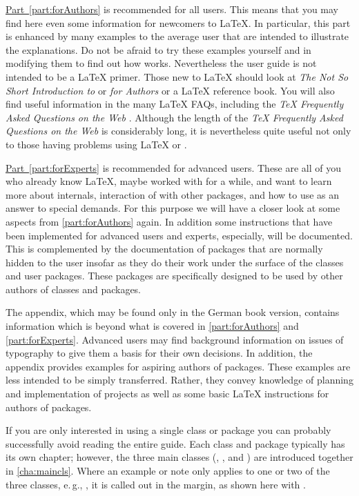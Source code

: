 \hyperref[part:forAuthors]{Part~\ref{part:forAuthors}} is recommended for all
\KOMAScript{} users. This means that you may find here even some information
for newcomers to \LaTeX. In particular, this part is enhanced by many examples
to the average user that are intended to illustrate the explanations. Do not
be afraid to try these examples yourself and in modifying them to find out how
\KOMAScript{} works. Nevertheless the {\KOMAScript} user guide is not intended
to be a {\LaTeX} primer.  Those new to {\LaTeX} should look at \emph{The Not
  So Short Introduction to {\LaTeXe}} \cite{lshort} or \emph{{\LaTeXe} for
  Authors} \cite{latex:usrguide} or a {\LaTeX} reference book. You will also
find useful information in the many {\LaTeX} FAQs, including the \emph{{\TeX}
  Frequently Asked Questions on the Web} \cite{UK:FAQ}.
Although the length of the \emph{{\TeX} Frequently Asked Questions
on the Web} is considerably long, it is nevertheless
quite useful not only to those having problems using \LaTeX{} or \KOMAScript. 

\hyperref[part:forExperts]{Part~\ref{part:forExperts}} is recommended for
advanced \KOMAScript{} users. These are all of you who already know
\LaTeX{}, maybe worked with \KOMAScript{} for a while, and want to
learn more about \KOMAScript{} internals, interaction of \KOMAScript{}
with other packages, and how to use \KOMAScript{} as an answer to
special demands. For this purpose we will have a closer look at some
aspects from \autoref{part:forAuthors} again. In addition some
instructions that have been implemented for advanced users and
experts, especially, will be documented. This is complemented by the
documentation of packages that are normally hidden to the user insofar
as they do their work under the surface of the classes and user
packages. These packages are specifically designed to be used by other
authors of classes and packages.

The appendix, which may be found only in the German book version, contains
information which is beyond what is covered in \autoref{part:forAuthors} and
\autoref{part:forExperts}.  Advanced users may find background information on
issues of typography to give them a basis for their own decisions. In
addition, the appendix provides examples for aspiring authors of
packages. These examples are less intended to be simply transferred. Rather,
they convey knowledge of planning and implementation of projects as well as
some basic \LaTeX{} instructions for authors of packages.

If you are only interested in using a single {\KOMAScript} class or package
you can probably successfully avoid reading the entire guide.  Each class and
package typically has its own chapter; however, the three main classes
(, , and ) are introduced
together in \autoref{cha:maincls}. Where an example or note only
applies to one or two of the three classes, e.\,g.,
, it is called out in the
margin, as
shown here with .

